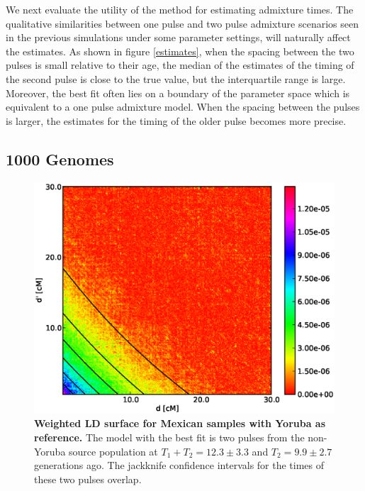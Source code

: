 \documentclass[10pt]{article}
\begin{document}
We next evaluate the utility of the method for estimating admixture times.  The
qualitative similarities between one pulse and two pulse admixture scenarios
seen in the previous  simulations under some parameter settings, will naturally
affect  the estimates. As shown in figure \ref{estimates}, when the spacing
between the two pulses is small relative to their age, the median of the
estimates of the timing of the second pulse is close to the true value, but the
interquartile range is large. Moreover, the best fit often lies on a boundary of
the parameter space which is equivalent to a one pulse admixture model. When the
spacing between the pulses is larger, the estimates for the timing of the older
pulse becomes more precise. \subsection{1000 Genomes} \begin{figure}
\includegraphics[scale=.6]{MXL.eps} \caption{ {\bf Weighted LD surface for
Mexican samples with Yoruba as reference.} The model with the best fit is two
pulses from the non-Yoruba source population at $T_1+T_2=12.3 \pm 3.3$ and
$T_2=9.9\pm 2.7$ generations ago. The jackknife confidence intervals for the
times of these two pulses overlap. } \label{ASH_MXL} \end{figure}
\end{document}
